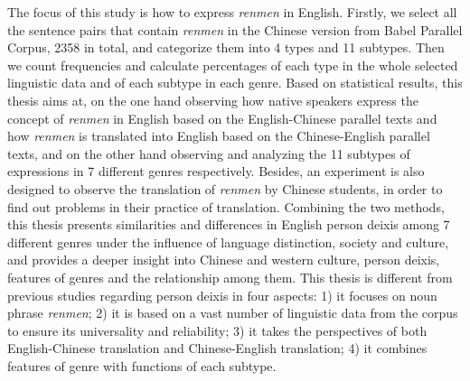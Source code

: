\documentclass[degree=bachelor,language=english]{sysuthesis}
\begin{document}
\begin{abstract*}
  The focus of this study is how to express \emph{renmen} in English. Firstly, we select all the sentence pairs that contain \emph{renmen} in the Chinese version from Babel Parallel Corpus, 2358 in total, and categorize them into 4 types and 11 subtypes. Then we count frequencies and calculate percentages of each type in the whole selected linguistic data and of each subtype in each genre. Based on statistical results, this thesis aims at, on the one hand observing how native speakers express the concept of \emph{renmen} in English based on the English-Chinese parallel texts and how \emph{renmen} is translated into English based on the Chinese-English parallel texts, and on the other hand observing and analyzing the 11 subtypes of expressions in 7 different genres respectively. Besides, an experiment is also designed to observe the translation of \emph{renmen} by Chinese students, in order to find out problems in their practice of translation. Combining the two methods, this thesis presents similarities and differences in English person deixis among 7 different genres under the influence of language distinction, society and culture, and provides a deeper insight into Chinese and western culture, person deixis, features of genres and the relationship among them. This thesis is different from previous studies regarding person deixis in four aspects: 1) it focuses on noun phrase \emph{renmen}; 2) it is based on a vast number of linguistic data from the corpus to ensure its universality and reliability; 3) it takes the perspectives of both English-Chinese translation and Chinese-English translation; 4) it combines features of genre with functions of each subtype.

\end{abstract*}

\tableofcontents
\end{document}
